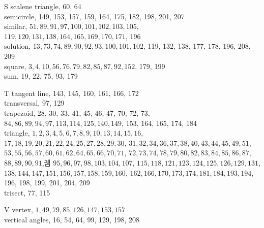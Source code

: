 \documentclass[10pt]{article}
\begin{document}
S
scalene triangle, 60, 64\\
semicircle, 149, 153, 157, 159, 164, 175, 182, 198, 201, 207\\
similar, \(51,89,91,97,100,101,102,103,105\), \(119,120,131,138,164,165,169,170,171\), 196\\
solution, \(13,73,74,89,90,92,93,100,101,102\), 119, 132, 138, 177, 178, 196, 208, 209\\
square, \(3,4,10,56,76,79,82,85,87,92,152\), 179, 199\\
sum, 19, 22, 75, 93, 179

T
tangent line, 143, 145, 160, 161, 166, 172\\
transversal, 97, 129\\
trapezoid, 28, 30, 33, 41, 45, 46, 47, 70, 72, 73, \(84,86,89,94,97,113,114,125,140,149\), 153, 164, 165, 174, 184\\
triangle, \(1,2,3,4,5,6,7,8,9,10,13,14,15,16\), \(17,18,19,20,21,22,24,25,27,28,29,30\), \(31,32,34,36,37,38,40,43,44,45,49,51\), \(53,55,56,57,60,61,62,64,65,66,70,71\), \(72,73,74,78,79,80,82,83,84,85,86,87\), \(88,89,90,91\),궴 \(95,96,97,98,103,104,107\), \(115,118,121,123,124,125,126,129,131\), \(138,144,147,151,156,157,158,159,160\), \(162,166,170,173,174,181,184,193,194\), 196, 198, 199, 201, 204, 209\\
trisect, 77, 115

V
vertex, \(1,49,79,85,126,147,153,157\)\\
vertical angles, 16, 54, 64, 99, 129, 198, 208
\end{document}
